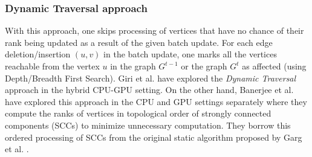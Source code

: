 \subsubsection{Dynamic Traversal approach}
\label{sec:about-traversal}

With this approach, one skips processing of vertices that have no chance of their rank being updated as a result of the given batch update. For each edge deletion/insertion $(u, v)$ in the batch update, one marks all the vertices reachable from the vertex $u$ in the graph $G^{t-1}$ or the graph $G^t$ as affected (using Depth/Breadth First Search). Giri et al. \cite{rank-giri20} have explored the \textit{Dynamic Traversal} approach in the hybrid CPU-GPU setting. On the other hand, Banerjee et al. \cite{rank-sahu22} have explored this approach in the CPU and GPU settings separately where they compute the ranks of vertices in topological order of strongly connected components (SCCs) to minimize unnecessary computation. They borrow this ordered processing of SCCs from the original static algorithm proposed by Garg et al. \cite{rank-garg16}.




